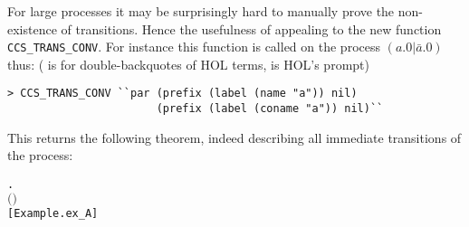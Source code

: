 For large processes it may be surprisingly hard to manually prove the
non-existence of transitions.  Hence the usefulness of appealing to
the new  function \texttt{CCS\_TRANS\_CONV}.
For instance this function
is called on the  process $(a.0 | \bar{a}.0)$ thus:
(\mbox{} is for double-backquotes of HOL
  terms, \mbox{\color{blue}{\texttt{>}}} is HOL's prompt)
\begin{lstlisting}
> CCS_TRANS_CONV ``par (prefix (label (name "a")) nil)
                       (prefix (label (coname "a")) nil)``
\end{lstlisting}
This returns the following theorem, indeed describing all immediate
transitions of the process:
\begin{alltt}
\HOLTokenTurnstile{} \HOLSymConst{\HOLTokenForall{}} .
       \HOLConst{\HOLTokenInputAct} \HOLSymConst{\ensuremath{\ldotp}} \HOLSymConst{\ensuremath{\mid}} \HOLConst{\HOLTokenOutputAct} \HOLSymConst{\ensuremath{\ldotp}} \HOLTokenTransBegin{}\HOLTokenTransEnd {} \HOLSymConst{\HOLTokenEquiv{}}
       \ensuremath{(} \HOLSymConst{\ensuremath{=}} \HOLConst{\HOLTokenInputAct}  \HOLSymConst{\HOLTokenConj{}}  \HOLSymConst{\ensuremath{=}}  \HOLSymConst{\ensuremath{\mid}} \HOLConst{\HOLTokenOutputAct} \HOLSymConst{\ensuremath{\ldotp}} \HOLSymConst{\HOLTokenDisj{}}  \HOLSymConst{\ensuremath{=}} \HOLConst{\HOLTokenOutputAct}  \HOLSymConst{\HOLTokenConj{}}  \HOLSymConst{\ensuremath{=}} \HOLConst{\HOLTokenInputAct} \HOLSymConst{\ensuremath{\ldotp}} \HOLSymConst{\ensuremath{\mid}} \ensuremath{)} \HOLSymConst{\HOLTokenDisj{}}
        \HOLSymConst{\ensuremath{=}} \HOLSymConst{\ensuremath{\tau}} \HOLSymConst{\HOLTokenConj{}}  \HOLSymConst{\ensuremath{=}}  \HOLSymConst{\ensuremath{\mid}} \hfill{[Example.ex_A]}
\end{alltt}

